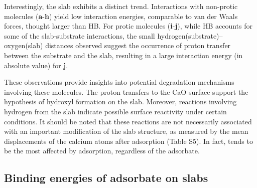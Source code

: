 \documentclass[journal=jpccck,manuscript=article]{achemso}
\begin{document}
Interestingly, the  slab exhibits a distinct trend. Interactions with non-protic molecules (\textbf{a}-\textbf{h}) yield low interaction energies, comparable to van der Waals forces, thought larger than HB. For protic molecules (\textbf{i}-\textbf{j}), while HB accounts for some of the slab-substrate interactions, the small hydrogen(substrate)--oxygen(slab) distances observed suggest the occurrence of proton transfer between the substrate and the slab, resulting in a large interaction energy (in absolute value) for \textbf{j}.

These observations provide insights into potential degradation mechanisms involving these molecules. The proton transfers to the CaO surface support the hypothesis of hydroxyl formation on the slab. Moreover, reactions involving hydrogen from the  slab indicate possible surface reactivity under certain conditions.  It should be noted that these reactions are not necessarily associated with an important modification of the slab structure, as measured by the mean displacements of the calcium atoms after adsorption (Table S5). In fact,  tends to be the most affected by adsorption, regardless of the adsorbate.

\subsection{Binding energies of adsorbate on slabs}\label{sec:BE's}

\newcommand{\XPSsa}[2]{
	\begin{figure}[!h]
		\centering
		\texttt{[image: Figure\#1]}
		\caption{Difference (dotted line) between the XPS spectra before (dashed line) and after (solid line) adsorption for compounds \textbf{#2} on various substrates, as computed using the \cpx{E_\infty} protocol. Letters indicate mean binding energies for bulk (``b"), surface (``s", with $\star$ marking the atom closest to the adsorbate), surface hydroxides (``h"), and different atoms of the adsorbate.}
		\label{fig:spectraXPSads#2}
	\end{figure}
}

\newcommand{\XPSsab}[4]{
	\begin{figure}[p]
		\centering
		\texttt{[image: Figure\#1]}
		\texttt{[image: Figure\#2]}
		\caption{Difference (dotted line) between the XPS spectra before (dashed line) and after (solid line) adsorption for compounds \textbf{#3} (panel a) and \textbf{#4} (panel b) on various substrates, as computed using the \cpx{E_\infty} protocol. Letters indicate mean binding energies for bulk (``b"), surface (``s", with $\star$ marking the atom closest to the adsorbate), surface hydroxides (``h"), and different atoms of the adsorbate.}
		\label{fig:spectraXPSads#3#4}
	\end{figure}
}
\end{document}
